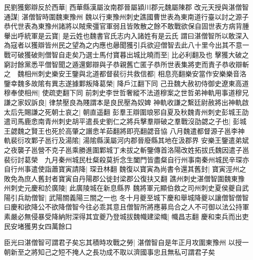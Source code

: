 民劉獲鄭辯反於西華|{
	西華縣漢屬汝南郡晉屬潁川郡元魏屬陳郡}
改元天授與湛僧智通謀|{
	湛僧智時圍魏東豫州}
魏以行東豫州刺史譙國曹世表為東南道行臺以討之源子恭代世表為東豫州諸將以賊衆彊官軍弱且皆敗散之餘不敢戰欲保自固世表方病背腫轝出呼統軍是云寶|{
	是云姓也魏書官氏志内入諸姓有是云氏}
謂曰湛僧智所以敢深入為寇者以獲辯皆州民之望為之内應也曏聞獲引兵欲迎僧智去此八十里今出其不意一戰可破獲破則僧智自走矣乃選士馬付寶暮出城比曉而至|{
	比必利翻及也}
擊獲大破之窮討餘黨悉平僧智聞之遁還鄭辯與子恭親舊亡匿子恭所世表集將吏而責子恭收辯斬之　魏相州刺史樂安王鑒與北道都督裴衍共救信都|{
	相息亮翻樂安當作安樂樂音洛}
鑒幸魏多故隂有異志遂據鄴叛降葛榮|{
	降戶江翻下同}
己丑魏大赦初侍御史遼東高道穆奉使相州|{
	使疏吏翻下同}
前刺史李世哲奢縱不法道穆案之世哲弟神軌用事道穆兄謙之家奴訴良|{
	律禁壓良為賤謂本是良民壓為奴婢}
神軌收謙之繫廷尉赦將出神軌啟太后先賜謙之死朝士哀之|{
	朝直遥翻}
彭羣王辯圍琅邪自夏及秋魏青州刺史彭城王劭遣司馬鹿悆南青州刺史胡平遣長史劉仁之將兵擊羣辯破之羣戰沒劭勰之子也|{
	彭城王勰魏之賢王也死於高肇之譖悆羊茹翻將即亮翻勰音協}
八月魏遣都督源子邕李神軌裴衍攻鄴子邕行及湯隂|{
	湯隂縣漢屬河内郡晉廢縣其地在汲郡界}
安樂王鑒遣弟斌之夜襲子邕營不克子邕乘勝進圍鄴城丁未拔之斬鑒傳首洛陽改姓拓拔氏魏因遣子邕裴衍討葛榮　九月秦州城民杜粲殺莫折念生闔門皆盡粲自行州事南秦州城民辛琛亦自行州事遣使詣蕭寶寅請降|{
	琛丑林翻}
魏復以寶寅為尚書令還其舊封|{
	寶寅涇州之敗免為庶人舊封者寶寅自丹陽郡公徙封梁郡公復扶又翻}
譙州刺史湛僧智圍魏東豫州刺史元慶和於廣陵|{
	此廣陵城在新息縣界}
魏將軍元顯伯救之司州刺史夏侯夔自武陽引兵助僧智|{
	武陽關義陽三關之一也}
冬十月夔至城下慶和舉城降夔以讓僧智僧智曰慶和欲降公不欲降僧智今往必乖其意且僧智所將應募烏合之人不可御以法公持軍素嚴必無侵暴受降納附深得其宜夔乃登城拔魏幟建梁幟|{
	幟昌志翻}
慶和束兵而出吏民安堵獲男女四萬餘口

臣光曰湛僧智可謂君子矣忘其積時攻戰之勞|{
	湛僧智自是年正月攻圍東豫州}
以授一朝新至之將知己之短不掩人之長功成不取以濟國事忠且無私可謂君子矣

